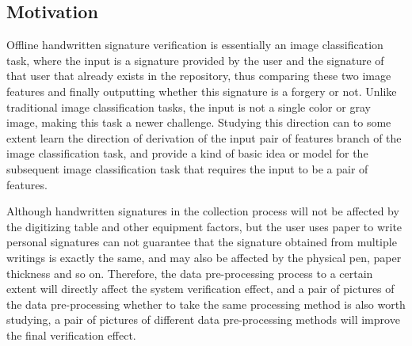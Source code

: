 \documentclass{article}
\begin{document}
\newpage

\subsection{Motivation}

Offline handwritten signature verification is essentially an image classification task, where the input is a signature provided by the user and the signature of that user that already exists in the repository, thus comparing these two image features and finally outputting whether this signature is a forgery or not. Unlike traditional image classification tasks, the input is not a single color or gray image, making this task a newer challenge. Studying this direction can to some extent learn the direction of derivation of the input pair of features branch of the image classification task, and provide a kind of basic idea or model for the subsequent image classification task that requires the input to be a pair of features.

Although handwritten signatures in the collection process will not be affected by the digitizing table and other equipment factors, but the user uses paper to write personal signatures can not guarantee that the signature obtained from multiple writings is exactly the same, and may also be affected by the physical pen, paper thickness and so on. Therefore, the data pre-processing process to a certain extent will directly affect the system verification effect, and a pair of pictures of the data pre-processing whether to take the same processing method is also worth studying, a pair of pictures of different data pre-processing methods will improve the final verification effect.
\end{document}
